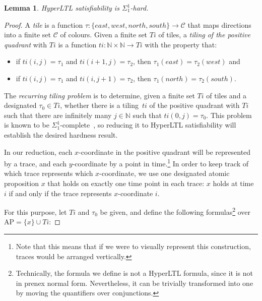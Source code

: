 \documentclass[dvipsnames,10pt,a4paper]{amsart}
\newtheorem{lem}[thm]{Lemma}
\theoremstyle{definition}
\theoremstyle{remark}
\newcommand{\set}[1]{\{#1\}}
\newcommand{\hyltl}{{HyperLTL}\xspace}
\newcommand{\ap}[0]{\mathrm{AP}}
\newcommand{\tileset}{\mathit{Ti}}
\newcommand{\tiling}{\mathit{ti}}
\newcommand{\east}{\mathit{east}}
\newcommand{\west}{\mathit{west}}
\newcommand{\north}{\mathit{north}}
\newcommand{\south}{\mathit{south}}
\begin{document}
\begin{lem}
\label{lemma:hyltl_hardness}
\hyltl satisfiability is $\Sigma_1^1$-hard.	
\end{lem}
\begin{proof}
A \emph{tile} is a function $\tau\colon\{\east,\west,\north,\south\}\to \mathcal{C}$
that maps directions into a finite set $\mathcal{C}$ of colours.
Given a finite set $\tileset$ of tiles, a \emph{tiling of the positive quadrant}
with $\tileset$ is a function $\tiling\colon\mathbb{N}\times\mathbb{N}\to \tileset$ with the property that:
\begin{itemize}
	\item if $\tiling(i,j)=\tau_1$ and $\tiling(i+1,j)=\tau_2$, then $\tau_1(\east)=\tau_2(\west)$ and
	\item if $\tiling(i,j)=\tau_1$ and $\tiling(i,j+1)=\tau_2$, then $\tau_1(\north)=\tau_2(\south)$.
\end{itemize}
The \emph{recurring tiling problem} is to determine, given a finite set $\tileset$ of tiles and a designated $\tau_0\in \tileset$, whether there is a tiling~$\tiling$ of the positive quadrant with $\tileset$ such that there are infinitely many $j\in\mathbb{N}$ such that $\tiling(0,j)=\tau_0$. 
%
This problem is known to be $\Sigma_1^1$-complete~\cite{Harel85}, so reducing it to \hyltl 
satisfiability will establish the desired hardness result. 

In our reduction, each $x$-coordinate in the positive quadrant will be represented by a trace, and each $y$-coordinate by a point in time.\footnote{Note that this means that if we were to visually represent this construction, traces would be arranged vertically.} In order to keep track of which trace represents which $x$-coordinate, we use one designated atomic proposition $x$ that holds on exactly one time point in each trace: $x$ holds at time $i$ if and only if the trace represents $x$-coordinate $i$.

For this purpose, let $\tileset$ and $\tau_0$ be given, and define the following formulas\footnote{Technically, the formula we define is not a \hyltl formula, since it is not in prenex normal form. Nevertheless, it can be trivially transformed into one by moving the quantifiers over conjunctions.} over $\ap = \set{ x } \cup \tileset$:


\end{proof}
\end{document}
